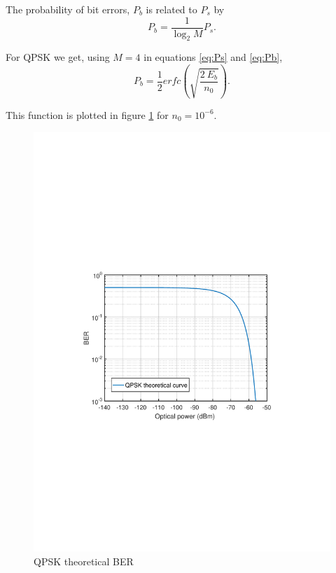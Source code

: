The probability of bit errors, $P_b$ is related to $P_s$ by
\begin{equation}
	P_b=\frac{1}{\log_2 M}P_s.
	\label{eq:Pb}
\end{equation} 

For QPSK we get, using $M=4$ in equations \ref{eq:Ps} and \ref{eq:Pb},
\begin{equation}
	P_b=\frac{1}{2} erfc\left(\sqrt{\frac{2~E_b}{n_0}}\right).
\end{equation}

This function is plotted in figure \ref{fig:QPSK_th_curve} for $n_0=10^{-6}$.

\begin{figure}[h]
		\centering
		\includegraphics[clip, trim=0.5cm 9cm 0.5cm 9cm, width=\textwidth]{./sdf/m_qam_system/figures/BER_QPSK_theory.pdf}
		\caption{QPSK theoretical BER}
		\label{fig:QPSK_th_curve}
\end{figure}
